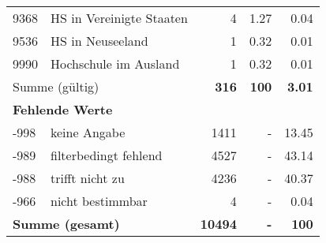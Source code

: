 \begin{longtable}{lXrrr}
        9368 & \multicolumn{1}{X}{HS in Vereinigte Staaten} & %
          \num{4} &
          \num[round-mode=places,round-precision=2]{1.27} &
          \num[round-mode=places,round-precision=2]{0.04} \\

        9536 & \multicolumn{1}{X}{HS in Neuseeland} & %
          \num{1} &
          \num[round-mode=places,round-precision=2]{0.32} &
          \num[round-mode=places,round-precision=2]{0.01} \\

        9990 & \multicolumn{1}{X}{Hochschule im Ausland} & %
          \num{1} &
          \num[round-mode=places,round-precision=2]{0.32} &
          \num[round-mode=places,round-precision=2]{0.01} \\

     \midrule
     \multicolumn{2}{l}{Summe (gültig)} &
       \textbf{\num{316}} &
     \textbf{\num{100}} &
       \textbf{\num[round-mode=places,round-precision=2]{3.01}} \\
     \multicolumn{5}{l}{\textbf{Fehlende Werte}}\\
       -998 &
       keine Angabe &
         \num{1411} &
        - &
         \num[round-mode=places,round-precision=2]{13.45} \\
       -989 &
       filterbedingt fehlend &
         \num{4527} &
        - &
         \num[round-mode=places,round-precision=2]{43.14} \\
       -988 &
       trifft nicht zu &
         \num{4236} &
        - &
         \num[round-mode=places,round-precision=2]{40.37} \\
       -966 &
       nicht bestimmbar &
         \num{4} &
        - &
         \num[round-mode=places,round-precision=2]{0.04} \\
     \midrule
     \multicolumn{2}{l}{\textbf{Summe (gesamt)}} &
          \textbf{\num{10494}} &
        \textbf{-} &
        \textbf{\num{100}} \\
     \bottomrule
     \end{longtable}
     
